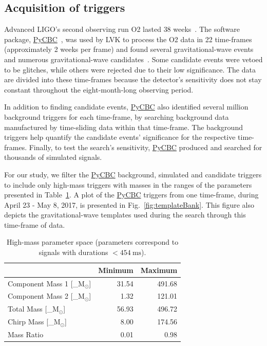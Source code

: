 \documentclass[%
 nofootinbib,
 amsmath,amssymb,
 aps,
 twocolumn,
 superscriptaddress
]{revtex4-2}
\newcommand{\pycbc}{{\sc \href{https://pycbc.org/}{{PyCBC}}}\xspace}
\newcommand{\mathcmd}[1]{{\sc \relax\ifmmode#1\else $#1$\fi}\xspace}
\newcommand{\msun}{\mathcmd{\text{M}_\odot}}
\begin{document}
\subsection{Acquisition of triggers}
Advanced LIGO's second observing run O2 lasted $38$ weeks~\cite{GWOSC}. The software package, \pycbc~\cite{pycbc_code}, was used by LVK to process the O2 data in 22 time-frames (approximately 2 weeks per frame) and found several gravitational-wave events and numerous gravitational-wave candidates~\cite{pycbc_og0, pycbc_og1, pycbc_og2, pycbc_og3, pycbc_og4, pycbc_og5, pycbc_og6}. Some candidate events were vetoed to be glitches, while others were rejected due to their low significance. The data are divided into these time-frames because the detector's sensitivity does not stay constant throughout the eight-month-long observing period.

In addition to finding candidate events, \pycbc also identified several million background triggers for each time-frame, by searching background data manufactured by time-sliding data within that time-frame. The background triggers help quantify the candidate events' significance for the respective time-frames. Finally, to test the search's sensitivity, \pycbc produced and searched for thousands of simulated signals. 

For our study, we filter the \pycbc background, simulated and candidate triggers to include only high-mass triggers with masses in the ranges of the parameters presented in Table~\ref{tab:parameters}. A plot of the \pycbc triggers from one time-frame, during April 23 - May 8, 2017, is presented in Fig.~\ref{fig:templateBank}. This figure also depicts the gravitational-wave templates used during the search through this time-frame of data. 

\begin{table}[t]

\caption[BBH parameters correspond to duration $<454\ \text{ms}$]{\label{tab:parameters}High-mass parameter space (parameters correspond to signals with durations $<454 \ \text{ms}$). }
\centering
\begin{tabular}{lrr}
\toprule
  & Minimum & Maximum\\
\midrule
Component Mass 1 [\msun] & 31.54 & 491.68\\
Component Mass 2 [\msun] & 1.32 & 121.01\\
Total Mass [\msun] & 56.93 & 496.72\\
Chirp Mass [\msun] & 8.00 & 174.56\\
Mass Ratio & 0.01 & 0.98\\
\end{tabular}
\end{table}
\end{document}

